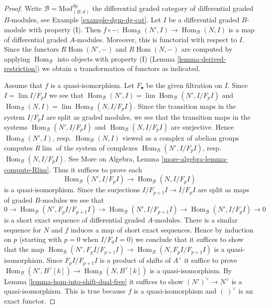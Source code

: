 \documentclass[10pt,a4paper]{amsart}
\theoremstyle{plain}
\theoremstyle{definition}
\theoremstyle{remark}
\numberwithin{equation}{subsection}
\def\lim{\mathop{\mathrm{lim}}\nolimits}
\def\Hom{\mathop{\mathrm{Hom}}\nolimits}
\begin{document}
\begin{proof}
Write $\mathcal{B} = \text{Mod}^{dg}_{(B, \text{d})}$ the
differential graded category of differential graded $B$-modules, see
Example \ref{example-dgm-dg-cat}.
Let $I$ be a differential graded $B$-module with property (I).
Then $f \circ - : \Hom_\mathcal{B}(N', I) \to \Hom_\mathcal{B}(N, I)$
is a map of differential graded $A$-modules. Moreover, this is functorial
with respect to $I$. Since the functors
$ R\Hom(N', -)$ and $R\Hom(N, -)$ are
computed by applying $\Hom_\mathcal{B}$ into objects with property (I)
(Lemma \ref{lemma-derived-restriction}) we obtain a transformation of functors
as indicated.

\medskip\noindent
Assume that $f$ is a quasi-isomorphism. Let $F_\bullet$ be the
given filtration on $I$. Since $I = \lim I/F_pI$ we see that
$\Hom_\mathcal{B}(N', I) = \lim \Hom_\mathcal{B}(N', I/F_pI)$ and
$\Hom_\mathcal{B}(N, I) = \lim \Hom_\mathcal{B}(N, I/F_pI)$.
Since the transition maps in the system $I/F_pI$ are split
as graded modules, we see that the transition maps in the
systems $\Hom_\mathcal{B}(N', I/F_pI)$ and $\Hom_\mathcal{B}(N, I/F_pI)$
are surjective. Hence $\Hom_\mathcal{B}(N', I)$, resp. $\Hom_\mathcal{B}(N, I)$
viewed as a complex of abelian groups computes $R\lim$ of the system
of complexes
$\Hom_\mathcal{B}(N', I/F_pI)$, resp. $\Hom_\mathcal{B}(N, I/F_pI)$.
See More on Algebra, Lemma \ref{more-algebra-lemma-compute-Rlim}.
Thus it suffices to prove each
$$
\Hom_\mathcal{B}(N', I/F_pI) \to \Hom_\mathcal{B}(N, I/F_pI)
$$
is a quasi-isomorphism. Since the surjections $I/F_{p + 1}I \to I/F_pI$
are split as maps of graded $B$-modules we see that
$$
0 \to \Hom_\mathcal{B}(N', F_pI/F_{p + 1}I) \to
\Hom_\mathcal{B}(N', I/F_{p + 1}I) \to
\Hom_\mathcal{B}(N', I/F_pI) \to 0
$$
is a short exact sequence of differential graded $A$-modules.
There is a similar sequence for $N$ and $f$ induces a map
of short exact sequences. Hence by induction on $p$ (starting with $p = 0$
when $I/F_0I = 0$) we conclude that it suffices to show that
the map
$\Hom_\mathcal{B}(N', F_pI/F_{p + 1}I) \to \Hom_\mathcal{B}(N, F_pI/F_{p + 1}I)$
is a quasi-isomorphism. Since $F_pI/F_{p + 1}I$ is a product of shifts of
$A^\vee$ it suffice to prove
$\Hom_\mathcal{B}(N', B^\vee[k]) \to \Hom_\mathcal{B}(N, B^\vee[k])$
is a quasi-isomorphism. By Lemma \ref{lemma-hom-into-shift-dual-free}
it suffices to show $(N')^\vee \to N^\vee$ is a quasi-isomorphism.
This is true because $f$ is a quasi-isomorphism and $(\ )^\vee$
is an exact functor.
\end{proof}
\end{document}
